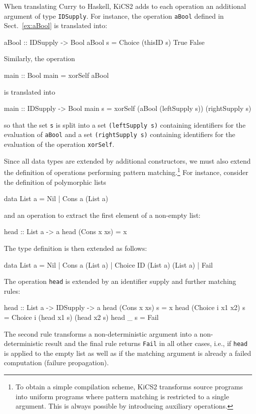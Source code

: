 \documentclass{llncs}
\newcommand{\code}[1]{\mbox{\small\texttt{#1}}}
\begin{document}
When translating Curry to Haskell, KiCS2 adds to each operation
an additional argument of type \code{IDSupply}.
For instance, the operation \code{aBool}
defined in Sect.~\ref{ex:aBool} is translated into:
\begin{haskell}
  aBool :: IDSupply -> Bool
  aBool s = Choice (thisID s) True False
\end{haskell}
Similarly, the operation
\begin{curry}
  main :: Bool
  main = xorSelf aBool
\end{curry}
is translated into
\begin{haskell}
  main :: IDSupply -> Bool
  main s = xorSelf (aBool (leftSupply s)) (rightSupply s)
\end{haskell}
so that the set \code{s} is split into a set \code{(leftSupply s)}
containing identifiers for the evaluation of \code{aBool}
and a set \code{(rightSupply s)} containing identifiers
for the evaluation of the operation \code{xorSelf}.

Since all data types are extended by additional constructors,
we must also extend the definition of operations performing
pattern matching.\footnote{To obtain a simple compilation scheme,
KiCS2 transforms source programs into uniform programs
\cite{BrasselHanusPeemoellerReck11} where pattern matching
is restricted to a single argument.
This is always possible by introducing auxiliary operations.}
For instance, consider the definition of polymorphic lists
\begin{curry}
  data List a = Nil | Cons a (List a)
\end{curry}
and an operation to extract the first element of a non-empty list:
\begin{curry}
  head :: List a -> a
  head (Cons x xs) = x
\end{curry}
The type definition is then extended as follows:
\begin{haskell}
  data List a = Nil | Cons a (List a) | Choice ID (List a) (List a) | Fail
\end{haskell}
The operation \code{head} is extended by an identifier supply
and further matching rules:
\begin{haskell}
  head :: List a -> IDSupply -> a
  head (Cons x xs)      s = x
  head (Choice i x1 x2) s = Choice i (head x1 s) (head x2 s)
  head _                s = Fail
\end{haskell}
The second rule transforms a non-deterministic argument
into a non-deterministic result and
the final rule returns \code{Fail} in all other cases,
i.e., if \code{head} is
applied to the empty list as well as if the matching argument
is already a failed computation (failure propagation).
\end{document}

